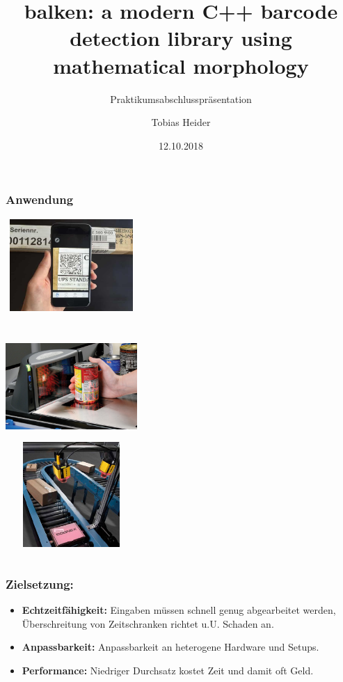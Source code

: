 \documentclass{beamer}
\title{balken: a modern C++ barcode detection
library using mathematical morphology}
\subtitle{Praktikumsabschlusspräsentation}
\author{Tobias Heider}
\institute{Institut für Informatik, LMU M\"unchen}
\date{12.10.2018}
\begin{document}
 
\frame{\titlepage}

\begin{frame}
\frametitle{Anwendung}
\centering
\includegraphics[width=5cm,height=3.5cm]{images/smartphone}
\begin{columns}[t]
\centering
\includegraphics[width=5cm,height=4cm]{images/kasse} \\
\centering
\includegraphics[width=5cm,height=4cm]{images/conveyor}
\end{columns}
\end{frame}
 
\begin{frame}
  \frametitle{Zielsetzung:}
  \begin{itemize}
    \renewcommand{\labelitemi}{--}
  \item \textbf{Echtzeitfähigkeit:} Eingaben müssen schnell genug abgearbeitet werden,
    Überschreitung von Zeitschranken richtet u.U. Schaden an.
  \item \textbf{Anpassbarkeit:} Anpassbarkeit an heterogene Hardware und Setups.
  \item  \textbf{Performance:} Niedriger Durchsatz kostet Zeit und damit oft Geld.
  \end{itemize}

\end{frame}
\end{document}
